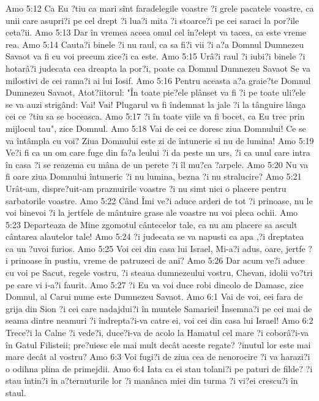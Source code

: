 Amo 5:12  Ca Eu ?tiu ca mari sînt faradelegile voastre ?i grele pacatele voastre, ca unii care asupri?i pe cel drept ?i lua?i mita ?i stoarce?i pe cei saraci la por?ile ceta?ii.
Amo 5:13  Dar în vremea aceea omul cel în?elept va tacea, ca este vreme rea.
Amo 5:14  Cauta?i binele ?i nu raul, ca sa fi?i vii ?i a?a Domnul Dumnezeu Savaot va fi cu voi precum zice?i ca este.
Amo 5:15  Urâ?i raul ?i iubi?i binele ?i hotarâ?i judecata cea dreapta la por?i, poate ca Domnul Dumnezeu Savaot Se va milostivi de cei rama?i ai lui Iosif.
Amo 5:16  Pentru aceasta a?a graie?te Domnul Dumnezeu Savaot, Atot?iitorul: "În toate pie?ele plânset va fi ?i pe toate uli?ele se va auzi strigând: Vai! Vai! Plugarul va fi îndemnat la jale ?i la tânguire lânga cei ce ?tiu sa se boceasca.
Amo 5:17  ?i în toate viile va fi bocet, ca Eu trec prin mijlocul tau", zice Domnul.
Amo 5:18  Vai de cei ce doresc ziua Domnului! Ce se va întâmpla cu voi? Ziua Domnului este zi de întuneric si nu de lumina!
Amo 5:19  Ve?i fi ca un om care fuge din fa?a leului ?i da peste un urs, ?i ca unul care intra în casa ?i se reazema cu mâna de un perete ?i îl mu?ca ?arpele.
Amo 5:20  Nu va fi oare ziua Domnului întuneric ?i nu lumina, bezna ?i nu stralucire?
Amo 5:21  Urât-am, dispre?uit-am praznuirile voastre ?i nu simt nici o placere pentru sarbatorile voastre.
Amo 5:22  Când Îmi ve?i aduce arderi de tot ?i prinoase, nu le voi binevoi ?i la jertfele de mântuire grase ale voastre nu voi pleca ochii.
Amo 5:23  Departeaza de Mine zgomotul cântecelor tale, ca nu am placere sa ascult cântarea alautelor tale!
Amo 5:24  ?i judecata se va napusti ca apa ,?i dreptatea ca un ?uvoi furios.
Amo 5:25  Voi cei din casa lui Israel, Mi-a?i adus, oare, jertfe ?i prinoase în pustiu, vreme de patruzeci de ani?
Amo 5:26  Dar acum ve?i aduce cu voi pe Sacut, regele vostru, ?i steaua dumnezeului vostru, Chevan, idolii vo?tri pe care vi i-a?i faurit.
Amo 5:27  ?i Eu va voi duce robi dincolo de Damasc, zice Domnul, al Carui nume este Dumnezeu Savaot.
Amo 6:1  Vai de voi, cei fara de grija din Sion ?i cei care nadajdui?i în muntele Samariei! Însemna?i pe cei mai de seama dintre neamuri ?i îndrepta?i-va catre ei, voi cei din casa lui Israel!
Amo 6:2  Trece?i la Calne ?i vede?i, duce?i-va de acolo la Hamatul cel mare ?i coborâ?i-va în Gatul Filisteii; pre?uiesc ele mai mult decât aceste regate? ?inutul lor este mai mare decât al vostru?
Amo 6:3  Voi fugi?i de ziua cea de nenorocire ?i va harazi?i o odihna plina de primejdii.
Amo 6:4  Iata ca ei stau tolani?i pe paturi de filde? ?i stau întin?i în a?ternuturile lor ?i manânca miei din turma ?i vi?ei crescu?i în staul.
